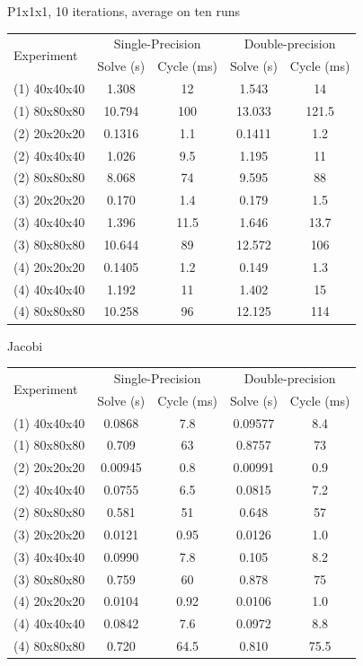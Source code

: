 \documentclass[a4paper,10pt]{article}
\begin{document}
   P1x1x1, 10 iterations, average on ten runs\\
   \begin{tabular}{|l|c|c|c|c|}
   \hline
    \multirow{2}{*}{Experiment} & \multicolumn{2}{c|}{Single-Precision} & \multicolumn{2}{c|}{Double-precision} \\
    \cline{2-5}
    & Solve (s) & Cycle (ms) & Solve (s) & Cycle (ms) \\
    \hline
    (1) 40x40x40 & 1.308 & 12 & 1.543 & 14\\
    \hline
    (1) 80x80x80 & 10.794 & 100 & 13.033 & 121.5\\
    \hline
    (2) 20x20x20 & 0.1316 & 1.1 & 0.1411 & 1.2 \\
    \hline
    (2) 40x40x40 & 1.026 & 9.5 & 1.195 & 11 \\
    \hline
    (2) 80x80x80 & 8.068 & 74 & 9.595 & 88 \\
    \hline
     (3) 20x20x20 & 0.170 & 1.4 & 0.179 & 1.5 \\
    \hline
     (3) 40x40x40 & 1.396 & 11.5 & 1.646 & 13.7 \\
    \hline
     (3) 80x80x80 & 10.644 & 89 & 12.572 & 106 \\
    \hline
     (4) 20x20x20 & 0.1405 & 1.2 & 0.149 & 1.3 \\
    \hline
     (4) 40x40x40 & 1.192 & 11 & 1.402 & 15\\
    \hline
     (4) 80x80x80 & 10.258 & 96 & 12.125 & 114 \\
    \hline
   \end{tabular}	
   
   Jacobi\begin{tabular}{|l|c|c|c|c|}
   \hline
    \multirow{2}{*}{Experiment} & \multicolumn{2}{c|}{Single-Precision} & \multicolumn{2}{c|}{Double-precision} \\
    \cline{2-5}
    & Solve (s) & Cycle (ms) & Solve (s) & Cycle (ms) \\
    \hline
    (1) 40x40x40 & 0.0868 & 7.8 & 0.09577 & 8.4\\
    \hline
    (1) 80x80x80 & 0.709 & 63 & 0.8757 & 73\\
    \hline
    (2) 20x20x20 & 0.00945 & 0.8 & 0.00991 & 0.9 \\
    \hline
    (2) 40x40x40 & 0.0755 & 6.5 & 0.0815 & 7.2 \\
    \hline
    (2) 80x80x80 & 0.581 & 51 & 0.648 & 57 \\
    \hline
     (3) 20x20x20 & 0.0121 & 0.95 & 0.0126 & 1.0 \\
    \hline
     (3) 40x40x40 & 0.0990 & 7.8 & 0.105 & 8.2 \\
    \hline
     (3) 80x80x80 & 0.759 & 60 & 0.878 & 75 \\
    \hline
     (4) 20x20x20 & 0.0104 & 0.92 & 0.0106 & 1.0 \\
    \hline
     (4) 40x40x40 & 0.0842 & 7.6 & 0.0972 & 8.8\\
    \hline
     (4) 80x80x80 & 0.720 & 64.5 & 0.810 & 75.5 \\
    \hline
   \end{tabular}
\end{document}
